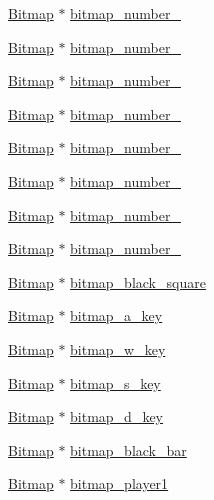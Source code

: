 \begin{DoxyCompactItemize}
\item 
\hyperlink{struct_bitmap}{Bitmap} $\ast$ \hyperlink{group___bitmap_gabff0396d599ff9c20dc45260ac0023e3}{bitmap\+\_\+number\+\_}
\item 
\hyperlink{struct_bitmap}{Bitmap} $\ast$ \hyperlink{group___bitmap_ga691847399b96e5814e96eaa88d89a565}{bitmap\+\_\+number\+\_}
\item 
\hyperlink{struct_bitmap}{Bitmap} $\ast$ \hyperlink{group___bitmap_ga0d04224487333eb3e7b5e2f6f84c0c7c}{bitmap\+\_\+number\+\_}
\item 
\hyperlink{struct_bitmap}{Bitmap} $\ast$ \hyperlink{group___bitmap_ga2462605cb4d4dee9006653ffafe12fbc}{bitmap\+\_\+number\+\_}
\item 
\hyperlink{struct_bitmap}{Bitmap} $\ast$ \hyperlink{group___bitmap_ga70b99f25995d8138d51132de297e66ba}{bitmap\+\_\+number\+\_}
\item 
\hyperlink{struct_bitmap}{Bitmap} $\ast$ \hyperlink{group___bitmap_ga8c4df34a71fbac148bc9ace8ba6095fa}{bitmap\+\_\+number\+\_}
\item 
\hyperlink{struct_bitmap}{Bitmap} $\ast$ \hyperlink{group___bitmap_ga0b28cdc22a12665fb94f55d1c9d269f2}{bitmap\+\_\+number\+\_}
\item 
\hyperlink{struct_bitmap}{Bitmap} $\ast$ \hyperlink{group___bitmap_ga8af434fd1017cdac47579582bac12552}{bitmap\+\_\+number\+\_}
\item 
\hyperlink{struct_bitmap}{Bitmap} $\ast$ \hyperlink{group___bitmap_ga3a3b4fedabcc22d1b0f34e651fcfdb46}{bitmap\+\_\+black\+\_\+square}
\item 
\hyperlink{struct_bitmap}{Bitmap} $\ast$ \hyperlink{group___bitmap_ga508d397d656733b6434a84217519cf27}{bitmap\+\_\+a\+\_\+key}
\item 
\hyperlink{struct_bitmap}{Bitmap} $\ast$ \hyperlink{group___bitmap_ga4f21d75b1561dd84963d37fb8149544b}{bitmap\+\_\+w\+\_\+key}
\item 
\hyperlink{struct_bitmap}{Bitmap} $\ast$ \hyperlink{group___bitmap_gaec5fd5db7147e57f72076387bc78ffc9}{bitmap\+\_\+s\+\_\+key}
\item 
\hyperlink{struct_bitmap}{Bitmap} $\ast$ \hyperlink{group___bitmap_ga3887cbeee8746670c47e70090cc926ae}{bitmap\+\_\+d\+\_\+key}
\item 
\hyperlink{struct_bitmap}{Bitmap} $\ast$ \hyperlink{group___bitmap_ga25ccce5a865640e111d5c3e6fd8405f5}{bitmap\+\_\+black\+\_\+bar}
\item 
\hyperlink{struct_bitmap}{Bitmap} $\ast$ \hyperlink{group___bitmap_ga2ba19da7f92ccbe27fd209c98816837a}{bitmap\+\_\+player1}

\end{DoxyCompactItemize}
